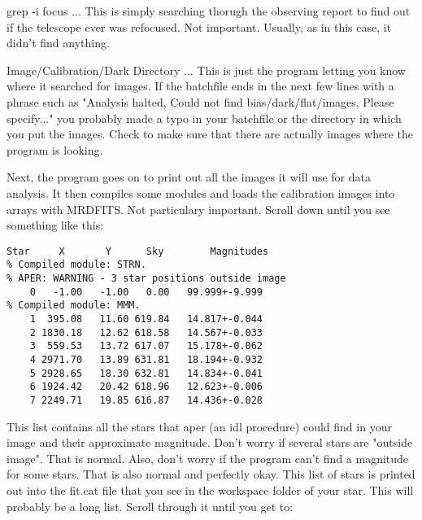 \documentclass[10pt,preprint]{aastex}
\begin{document}
grep -i focus ... This is simply searching thorugh the observing report to find out if the telescope ever was refocused. Not important. Usually, as in this case, it didn't find anything.

Image/Calibration/Dark Directory ... This is just the program letting you know where it searched for images. If the batchfile ends in the next few lines with a phrase such as "Analysis halted, Could not find bias/dark/flat/images, Please specify..." you probably made a typo in your batchfile or the directory in which you put the images. Check to make sure that there are actually images where the program is looking.

Next, the program goes on to print out all the images it will use for data analysis. It then compiles some modules and loads the calibration images into arrays with MRDFITS. Not particulary important. Scroll down until you see something like this:

\begin{verbatim}
Star     X       Y      Sky        Magnitudes
% Compiled module: STRN.
% APER: WARNING - 3 star positions outside image
    0   -1.00   -1.00   0.00   99.999+-9.999
% Compiled module: MMM.
    1  395.08   11.60 619.84   14.817+-0.044
    2 1830.18   12.62 618.58   14.567+-0.033
    3  559.53   13.72 617.07   15.178+-0.062
    4 2971.70   13.89 631.81   18.194+-0.932
    5 2928.65   18.30 632.81   14.834+-0.041
    6 1924.42   20.42 618.96   12.623+-0.006
    7 2249.71   19.85 616.87   14.436+-0.028
\end{verbatim}

This list contains all the stars that aper (an idl procedure) could find in your image and their approximate magnitude. Don't worry if several stars are "outside image". That is normal. Also, don't worry if the program can't find a magnitude for some stars. That is also normal and perfectly okay. This list of stars is printed out into the fit.cat file that you see in the workspace folder of your star. This will probably be a long list. Scroll through it until you get to:
\end{document}
